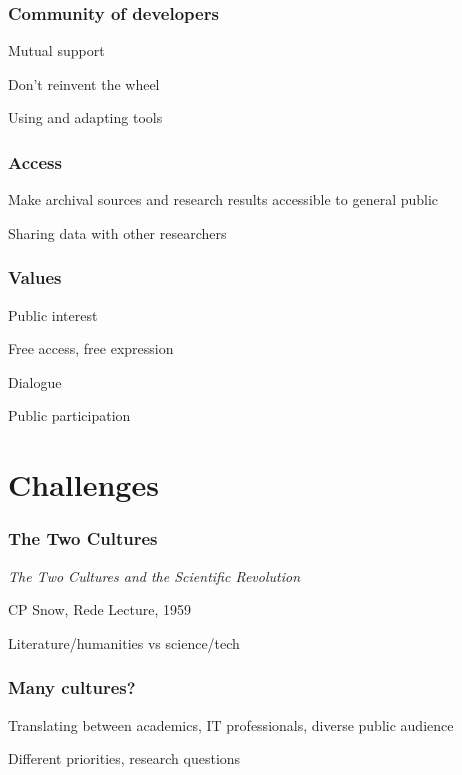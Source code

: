 \documentclass[ignorenonframetext,11pt]{beamer}
\begin{document}
\begin{frame}
\frametitle{Community of developers}
\label{communityofdevelopers}

Mutual support


Don't reinvent the wheel


Using and adapting tools



\end{frame}
		

\begin{frame}
\frametitle{Access}
\label{access}

Make archival sources and research results accessible to general public


Sharing data with other researchers



\end{frame}
		

\begin{frame}
\frametitle{Values}
\label{values}

Public interest


Free access, free expression


Dialogue


Public participation



\end{frame}
		

\section{Challenges}
\label{challenges}

\begin{frame}
\frametitle{The Two Cultures}
\label{thetwocultures}

{\itshape The Two Cultures and the Scientific Revolution}


CP Snow, Rede Lecture, 1959


Literature/humanities vs science/tech



\end{frame}
		

\begin{frame}
\frametitle{Many cultures?}
\label{manycultures}

Translating between academics, IT professionals, diverse public audience


Different priorities, research questions



\end{frame}
		
\end{document}
